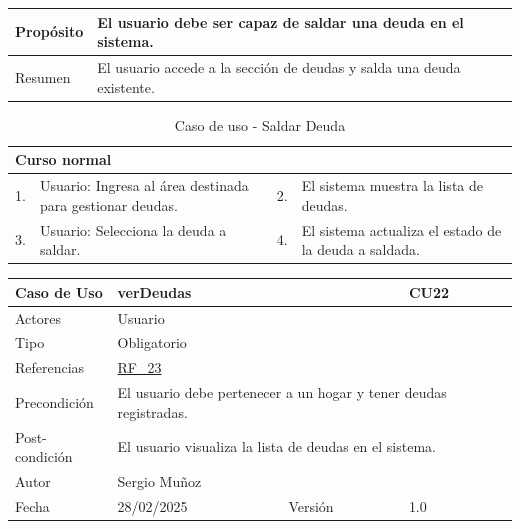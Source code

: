 \begin{table}[H]
    \centering
    \begin{tabular}{| m{} | m{} | m{} | m{} |}
        \hline
        Propósito & \multicolumn{3}{m{0.67\textwidth}|}{El usuario debe ser capaz de saldar una deuda en el sistema.} \\ 
        \hline
        Resumen & \multicolumn{3}{m{0.67\textwidth}|}{El usuario accede a la sección de deudas y salda una deuda existente.} \\ 
        \hline
    \end{tabular}
\end{table}

\begin{table}[H]
    \centering
    \begin{tabular}{| m{} | m{} | m{} | m{} |}
        \hline
        \multicolumn{4}{|m{0.9\textwidth}|}{Curso normal} \\ 
        \hline
        1. & Usuario: Ingresa al área destinada para gestionar deudas. 
        & 2. & El sistema muestra la lista de deudas. \\ 
        \hline
        3. & Usuario: Selecciona la deuda a saldar. 
        & 4. & El sistema actualiza el estado de la deuda a saldada. \\ 
        \hline
    \end{tabular}
    \caption{Caso de uso - Saldar Deuda}
\end{table}

\newpage

\begin{table}[H]
    \centering
    \begin{tabular}{| m{} | m{} | m{} | m{} |}
        \hline
        \rowcolor[HTML]{C0C0C0} Caso de Uso & \multicolumn{2}{|m{0.43\textwidth}|}{verDeudas} &  CU22\\ 
        \hline
        Actores & \multicolumn{3}{l|}{Usuario} \\ 
        \hline
        Tipo & \multicolumn{3}{l|}{Obligatorio} \\ 
        \hline
        Referencias & \multicolumn{3}{l|}{\hyperref[req:RF23]{RF\_23}} \\ 
        \hline
        Precondición & \multicolumn{3}{m{0.67\textwidth}|}{El usuario debe pertenecer a un hogar y tener deudas registradas.} \\ 
        \hline
        Post-condición & \multicolumn{3}{m{0.67\textwidth}|}{El usuario visualiza la lista de deudas en el sistema.} \\ 
        \hline
        Autor & \multicolumn{3}{l|}{Sergio Muñoz} \\ 
        \hline
        Fecha & 28/02/2025 & Versión & 1.0 \\ 
        \hline
    \end{tabular}
\end{table}

